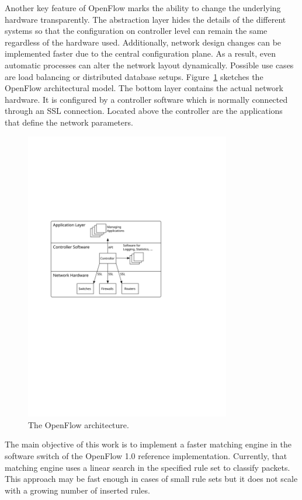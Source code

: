 \documentclass[a4paper,
		12pt,
		parskip=full,
		titlepage
		]{scrartcl}
\begin{document}
Another key feature of OpenFlow marks the ability to change the underlying hardware transparently.
The abstraction layer hides the details of the different systems so that 
the configuration on controller level can remain the same regardless of the hardware used.
Additionally, network design changes can be implemented faster due to the central configuration plane.
As a result, even automatic processes can alter the network layout dynamically.
Possible use cases are load balancing or distributed database setups.
Figure~\ref{fig:openflow-arch} sketches the OpenFlow architectural model.
The bottom layer contains the actual network hardware.
It is configured by a controller software which is normally connected through an SSL connection.
Located above the controller are the applications that define the network parameters.

\begin{figure}
\centering
\includegraphics[width=0.8\textwidth]{images/openflow-arch}
\caption{The OpenFlow architecture.}
\label{fig:openflow-arch}
\end{figure}

The main objective of this work is to implement a faster matching engine in the software switch of the OpenFlow 1.0 reference implementation.
Currently, that matching engine uses a linear search in the specified rule set to classify packets.
This approach may be fast enough in cases of small rule sets but it does not scale
with a growing number of inserted rules.
\end{document}
